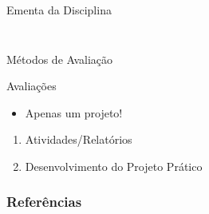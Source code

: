 \documentclass{beamer}
\begin{document}
\begin{frame}[c]{Ementa da Disciplina}
\begin{columns}[c]
\begin{column}{0.5\textwidth}
\begin{figure}
				{\cite{thrun2006probalistic}}
			\end{figure}
		\end{column}
	\end{columns}
\end{frame}


\begin{frame}{Métodos de Avaliação}
	\begin{block}{Avaliações}
		\begin{itemize}
			\item Apenas um projeto!
		\end{itemize}
		\begin{enumerate}
			\item Atividades/Relatórios
			\item Desenvolvimento do Projeto Prático
		\end{enumerate}
	\end{block}
\end{frame}



\begin{frame}[t, allowframebreaks]
	\frametitle{Referências}
	
\end{frame}
\end{document}
